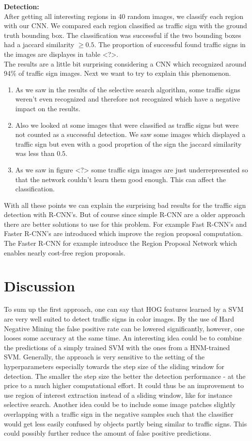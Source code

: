 \documentclass[12pt,a4paper,bibliography=totocnumbered,listof=totocnumbered]{scrartcl}
\begin{document}
\textbf{Detection:}\\
After getting all interesting regions in 40 random images, we classify each region with our CNN. We compared each region classified as traffic sign with the ground truth bounding box. The classification was successful if the two bounding boxes had a jaccard similarity $\geq 0.5$. The proportion of successful found traffic signs in the images are displayes in table <?>.\\
The results are a little bit surprising considering a CNN which recognized around 94\% of traffic sign images. Next we want to try to explain this phenomenon. 
\begin{enumerate}
\item As we saw in the results of the selective search algorithm, some traffic signs weren't even recognized and therefore not recognized which have a negative impact on the results. 
\item Also we looked at some images that were classified as traffic signs but were not counted as a successful detection. We saw some images which displayed a traffic sign but even with a good proprtion of the sign the jaccard similarity was less than $0.5$.
\item As we saw in figure <?> some traffic sign images are just underrepresented so that the network couldn't learn them good enough. This can affect the classification.
\end{enumerate}

With all these points we can explain the surprising bad results for the traffic sign detection with R-CNN's. But of course since simple R-CNN are a older approach there are better solutions to use for this problem. For example Fast R-CNN's and Faster R-CNN's are introduced which improve the region proposal computation. The Faster R-CNN for example introduce the Region Proposal Network which enables nearly cost-free region proposals.

\pagebreak
\section{Discussion}
To sum up the first approach, one can say that HOG features learned by a SVM are very well suited to detect traffic signs in color images. By the use of Hard Negative Mining the false positive rate can be lowered significantly, however, one looses some accuracy at the same time. An interesting idea could be to combine the predictions of a simply trained SVM with the ones from a HNM-trained SVM. Generally, the approach is very sensitive to the setting of the hyperparameters especially towards the step size of the sliding window for detection. The smaller the step size the better the detection performance - at the price to a much higher computational effort. It could thus be an improvement to use region of interest extraction instead of a sliding window, like for instance selective search. Another idea could be to include some image patches slightly overlapping with a traffic sign in the negative samples such that the classifier would get less easily confused by objects partly being similar to traffic signs. This could possibly further reduce the amount of false positive predictions. \\
\end{document}
